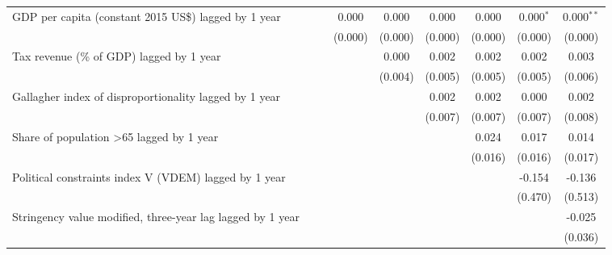 \begin{tabular}{lcccccccc}
   GDP per capita (constant 2015 US\$) lagged by 1 year       &                &                & 0.000          & 0.000         & 0.000         & 0.000         & 0.000$^{*}$   & 0.000$^{**}$\\   
                                                              &                &                & (0.000)        & (0.000)       & (0.000)       & (0.000)       & (0.000)       & (0.000)\\   
   Tax revenue (\% of GDP) lagged by 1 year                   &                &                &                & 0.000         & 0.002         & 0.002         & 0.002         & 0.003\\   
                                                              &                &                &                & (0.004)       & (0.005)       & (0.005)       & (0.005)       & (0.006)\\   
   Gallagher index of disproportionality lagged by 1 year     &                &                &                &               & 0.002         & 0.002         & 0.000         & 0.002\\   
                                                              &                &                &                &               & (0.007)       & (0.007)       & (0.007)       & (0.008)\\   
   Share of population >65 lagged by 1 year                   &                &                &                &               &               & 0.024         & 0.017         & 0.014\\   
                                                              &                &                &                &               &               & (0.016)       & (0.016)       & (0.017)\\   
   Political constraints index V (VDEM) lagged by 1 year      &                &                &                &               &               &               & -0.154        & -0.136\\   
                                                              &                &                &                &               &               &               & (0.470)       & (0.513)\\   
   Stringency value modified, three-year lag lagged by 1 year &                &                &                &               &               &               &               & -0.025\\   
                                                              &                &                &                &               &               &               &               & (0.036)\\   

\end{tabular}

